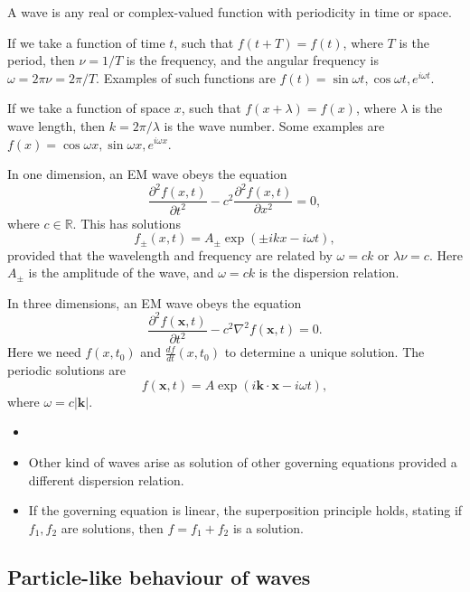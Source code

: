 \documentclass[12pt]{article}
\begin{document}
\begin{definition}
	A wave is any real or complex-valued function with periodicity in time or space.
\end{definition}

If we take a function of time $t$, such that $f(t + T) = f(t)$, where $T$ is the period, then $\nu = 1/T$ is the frequency, and the angular frequency is $\omega = 2 \pi \nu = 2 \pi/T$. Examples of such functions are $f(t) = \sin \omega t, \cos \omega t, e^{i \omega t}$.

If we take a function of space $x$, such that $f(x + \lambda) = f(x)$, where $\lambda$ is the wave length, then $k = 2 \pi/\lambda$ is the wave number. Some examples are $f(x) = \cos \omega x, \sin \omega x, e^{i \omega x}$.

In one dimension, an EM wave obeys the equation
\[
	\frac{\partial^2 f(x, t)}{\partial t^2} - c^2 \frac{\partial^2 f(x, t)}{\partial x^2} = 0
,\]
where $c \in \mathbb{R}$. This has solutions
\[
	f_{\pm}(x, t) = A_{\pm} \exp(\pm ikx - i\omega t)
,\]
provided that the wavelength and frequency are related by $\omega = ck$ or $\lambda \nu = c$. Here $A_{\pm}$ is the amplitude of the wave, and $\omega = ck$ is the dispersion relation.

In three dimensions, an EM wave obeys the equation
\[
	\frac{\partial^2 f(\mathbf{x}, t)}{\partial t^2} - c^2 \nabla^2 f(\mathbf{x}, t) = 0
.\]
Here we need $f(x, t_0)$ and $\frac{df}{dt} (x, t_0)$ to determine a unique solution. The periodic solutions are
\[
	f(\mathbf{x}, t) = A \exp(i \mathbf{k} \cdot \mathbf{x} - i \omega t)
,\]
where $\omega = c |\mathbf{k}|$.

\begin{remark}
	\begin{itemize}[(i)]
		\item[]
		\item Other kind of waves arise as solution of other governing equations provided a different dispersion relation.
		\item If the governing equation is linear, the superposition principle holds, stating if $f_1, f_2$ are solutions, then $f = f_1 + f_2$ is a solution.
	\end{itemize}
	
\end{remark}

\subsection{Particle-like behaviour of waves}%
\label{sub:particle_like_behaviour_of_waves}
\end{document}
